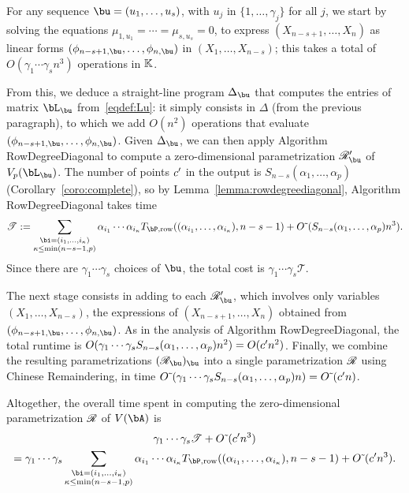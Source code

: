 \documentclass[12pt]{article}
\begin{document}
For any sequence $\bu=(u_1,\dots,u_s)$, with $u_j$ in
$\{1,\dots,\gamma_j\}$ for all $j$, we start by solving the equations
$\mu_{1,u_1} = \cdots = \mu_{s,u_s}=0$, to express
$(X_{n-s+1},\dots,X_n)$ as linear forms
$(\phi_{n-s+1,\bu},\dots,\phi_{n,\bu})$ in $(X_1,\dots,X_{n-s})$; this
takes a total of $O(\gamma_1 \cdots \gamma_s n^3 )$ operations in
$\mathbb{K}$.

From this, we deduce a straight-line program $\Delta_\bu$ that
computes the entries of matrix $\bL_\bu$ from~\eqref{eqdef:Lu}: it
simply consists in $\Delta$ (from the previous paragraph), to which we
add $O(n^2)$ operations that evaluate
$(\phi_{n-s+1,\bu},\dots,\phi_{n,\bu})$. Given $\Delta_\bu$, we can
then apply Algorithm {\sf RowDegreeDiagonal} to compute a
zero-dimensional parametrization $\scrR'_\bu$ of $V_p(\bL_\bu)$.  The
number of points ${c'}{}$ in the output is
$S_{n-s}(\alpha_1,\dots,\alpha_p)$ (Corollary~\ref{coro:complete}), so
by Lemma~\ref{lemma:rowdegreediagonal}, Algorithm {\sf
  RowDegreeDiagonal} takes time
\begin{eqnarray}
\mathscr{T}:=\sum_{\substack{\bi=(i_1,\dots,i_\kappa)\\ \kappa\le\min(n-s-1,p)}}
\alpha_{i_1} \cdots \alpha_{i_\kappa} T_{\bP,{\rm row}}((\alpha_{i_1},\dots,\alpha_{i_\kappa}), n-s-1)
+
\softO( S_{n-s}(\alpha_1,\dots,\alpha_p) n^3).  \label{eqdef:T}
\end{eqnarray}
Since there are $\gamma_1 \cdots \gamma_s$ choices of $\bu$, 
the total cost is $\gamma_1 \cdots \gamma_s \mathscr{T}$.


The next stage consists in adding to each $\scrR'_\bu$, which involves
only variables $(X_1,\dots,X_{n-s})$, the expressions of
$(X_{n-s+1},\dots,X_n)$ obtained from
$(\phi_{n-s+1,\bu},\dots,\phi_{n,\bu})$. As in the analysis of
Algorithm {\sf RowDegreeDiagonal}, the total runtime is $O(\gamma_1
\cdots \gamma_s S_{n-s}(\alpha_1,\dots,\alpha_p)  n^2)=O({c'}{} n^2)$. Finally, we
combine the resulting parametrizations $(\scrR_\bu)_\bu$ into a single
parametrization $\mathscr{R}$ using Chinese Remaindering, in time
${O}{\,\tilde{ }\,}(\gamma_1 \cdots \gamma_s  S_{n-s}(\alpha_1,\dots,\alpha_p) n)={O}{\,\tilde{ }\,}({c'}{} n)$.

Altogether, the overall time spent in computing the zero-dimensional
parametrization $\mathscr{R}$ of $V(\bA)$ is 
\begin{multline}\label{eq:VbA}
\gamma_1 \cdots \gamma_s \mathscr{T} +\softO( \rc n^3)  \\  = \gamma_1 \cdots \gamma_s\sum_{\substack{\bi=(i_1,\dots,i_\kappa)\\ \kappa\le\min(n-s-1,p)}}
\alpha_{i_1} \cdots \alpha_{i_\kappa} T_{\bP,{\rm row}}((\alpha_{i_1},\dots,\alpha_{i_\kappa}), n-s-1)
+\softO( \rc n^3).
\end{multline}
\end{document}
